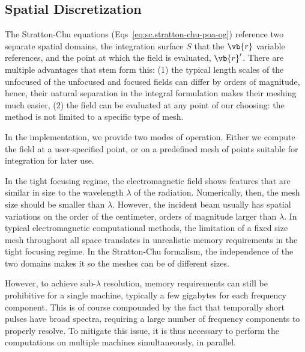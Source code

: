 \documentclass[11pt,SymmetricalJury]{inrsthesis/inrsthesis}
\begin{document}
\subsection{Spatial Discretization}

The Stratton-Chu equations (Eqs~\eqref{eq:sc.stratton-chu-poa-og}) reference two
separate spatial domains, the integration surface $S$ that the $\vb{r}$ variable
references, and the point at which the field is evaluated, $\vb{r}'$. There are
multiple advantages that stem form this: (1) the typical length scales of the
unfocused of the unfocused and focused fields can differ by orders of magnitude,
hence, their natural separation in the integral formulation makes their meshing
much easier, (2)  the field can be evaluated at any point of our choosing:
the method is not limited to a specific type of mesh.

In the implementation, we provide two modes of operation. Either we compute the
field at a user-specified point, or on a predefined mesh of points suitable
for integration for later use.

In the tight focusing regime, the electromagnetic field shows features that
are similar in size to the wavelength $\lambda$ of the radiation. Numerically,
then, the mesh size should be smaller than $\lambda$. However, the incident
beam usually has spatial variations on the order of the centimeter, orders
of magnitude larger than $\lambda$. In typical electromagnetic computational
methods, the limitation of a fixed size mesh throughout all space translates
in unrealistic memory requirements in the tight focusing regime. In the
Stratton-Chu formalism, the independence of the two domains makes it so
the meshes can be of different sizes.

However, to achieve sub-$\lambda$ resolution, memory requirements can still be
prohibitive for a single machine, typically a few gigabytes for each frequency
component. This is of course compounded by the fact that temporally short pulses
have broad spectra, requiring a large number of frequency components to properly
resolve. To mitigate this issue, it is thus necessary to perform the computations
on multiple machines simultaneously, in parallel.
\end{document}
